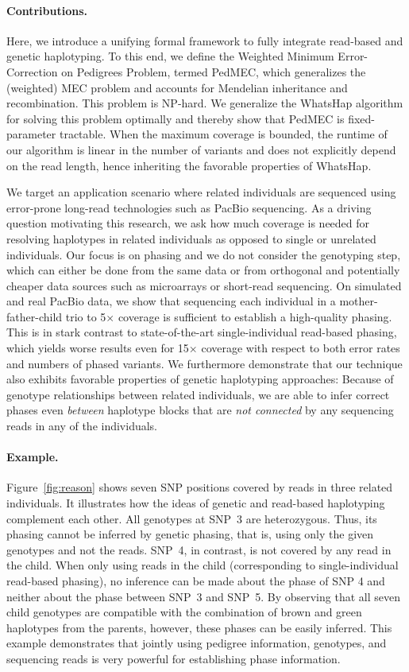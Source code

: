 \paragraph{Contributions.}
Here, we introduce a unifying formal framework to fully integrate read-based and genetic haplotyping.
To this end, we define the Weighted Minimum Error-Correction on Pedigrees Problem, termed PedMEC, which generalizes the (weighted) MEC problem and accounts for Mendelian inheritance and recombination.
This problem is NP-hard.
We generalize the WhatsHap algorithm for solving this problem optimally and thereby show that PedMEC is fixed-parameter tractable.
When the maximum coverage is bounded, the runtime of our algorithm is linear in the number of variants and does not explicitly depend on the read length, hence inheriting the favorable properties of WhatsHap.

We target an application scenario where related individuals are sequenced using error-prone long-read technologies such as PacBio sequencing.
As a driving question motivating this research, we ask how much coverage is needed for resolving haplotypes in related individuals as opposed to single or unrelated individuals.
Our focus is on phasing and we do not consider the genotyping step, which can either be done from the same data or from orthogonal and potentially cheaper data sources such as microarrays or short-read sequencing.
On simulated and real PacBio data, we show that sequencing each individual in a mother-father-child trio to 5$\times$ coverage is sufficient to establish a high-quality phasing.
This is in stark contrast to state-of-the-art single-individual read-based phasing, which yields worse results even for 15$\times$ coverage with respect to both error rates and numbers of phased variants.
We furthermore demonstrate that our technique also exhibits favorable properties of genetic haplotyping approaches:
Because of genotype relationships between related individuals, we are able to infer correct phases even \emph{between} haplotype blocks that are \emph{not connected} by any sequencing reads in any of the individuals.


\paragraph{Example.}
Figure~\ref{fig:reason} shows seven SNP positions covered by reads in three related individuals.
It illustrates how the ideas of genetic and read-based haplotyping complement each other.
All genotypes at SNP~3 are heterozygous.
Thus, its phasing cannot be inferred by genetic phasing, that is, using only the given genotypes and not the reads.
SNP~4, in contrast, is not covered by any read in the child.
When only using reads in the child (corresponding to single-individual read-based phasing), no inference can be made about the phase of SNP 4 and neither about the phase between SNP~3 and SNP~5.
By observing that all seven child genotypes are compatible with the combination of brown and green haplotypes from the parents, however, these phases can be easily inferred.
This example demonstrates that jointly using pedigree information, genotypes, and sequencing reads is very powerful for establishing phase information.

